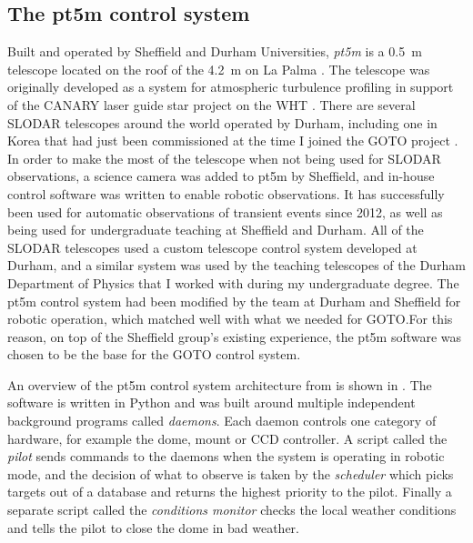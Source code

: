 \subsection{The pt5m control system}
\label{sec:pt5m}
\begin{colsection}

Built and operated by Sheffield and Durham Universities, \emph{pt5m} is a \SI{0.5}{\metre} telescope located on the roof of the \SI{4.2}{\metre}  on La Palma \citep{pt5m}. The telescope was originally developed as a  system for atmospheric turbulence profiling in support of the CANARY laser guide star project on the WHT \citep{SLODAR_LaPalma, CANARY}. There are several SLODAR telescopes around the world operated by Durham, including one in Korea that had just been commissioned at the time I joined the GOTO project \citep{SLODAR_Korea}. In order to make the most of the telescope when not being used for SLODAR observations, a science camera was added to pt5m by Sheffield, and in-house control software was written to enable robotic observations. It has successfully been used for automatic observations of transient events since 2012, as well as being used for undergraduate teaching at Sheffield and Durham. All of the SLODAR telescopes used a custom telescope control system developed at Durham, and a similar system was used by the teaching telescopes of the Durham Department of Physics that I worked with during my undergraduate degree. The pt5m control system had been modified by the team at Durham and Sheffield for robotic operation, which matched well with what we needed for GOTO.\@ For this reason, on top of the Sheffield group's existing experience, the pt5m software was chosen to be the base for the GOTO control system.

An overview of the pt5m control system architecture from \citet{pt5m} is shown in . The software is written in Python and was built around multiple independent background programs called \emph{daemons}. Each daemon controls one category of hardware, for example the dome, mount or CCD controller. A script called the \emph{pilot} sends commands to the daemons when the system is operating in robotic mode, and the decision of what to observe is taken by the \emph{scheduler} which picks targets out of a database and returns the highest priority to the pilot. Finally a separate script called the \emph{conditions monitor} checks the local weather conditions and tells the pilot to close the dome in bad weather.


\end{colsection}
